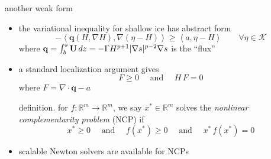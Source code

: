 \documentclass[hide notes,intlimits]{beamer}
\newcommand{\RR}{\mathbb{R}}
\newcommand{\Kcal}{\mathcal{K}}
\newcommand{\bq}{\mathbf{q}}
\newcommand{\Div}{\nabla\cdot}
\newcommand{\grad}{\nabla}
\newcommand{\ip}[2]{\ensuremath{\left<#1,#2\right>}}
\begin{document}
\begin{frame}{another weak form} 
\begin{itemize}
\item the variational inequality for shallow ice has abstract form
  $$- \ip{\bq(H,\grad H)}{\grad(\eta - H)} \ge \ip{a}{\eta-H} \qquad \forall \eta \in \Kcal$$
where $\bq=\int_b^s {\bf U}\, dz=-\Gamma H^{p+1} |\grad s|^{p-2} \grad s$ is the ``flux''
\item a standard localization argument gives
  $$F \ge 0 \quad \text{ and } \quad H\,F = 0$$
where $F = \Div \bq - a$
\begin{block}{definition.}
for $f:\RR^m \to \RR^m$, we say $x^* \in \RR^m$ solves the \emph{nonlinear complementarity problem} (NCP) if
  $$x^* \ge 0  \quad \text{ and } \quad f(x^*)\ge 0 \quad \text{ and } \quad x^*\,f(x^*)=0$$
\end{block}
\item scalable Newton solvers are available for NCPs
\end{itemize}
\end{frame}
\end{document}
